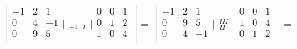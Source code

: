 $$
  \left[
  \begin{array}{rrr}
  -1 & 2 & 1 \\
    0 & 4 & -1 \\
    0 & 9 &  5 \\
  \end{array} \Bigg|
  \begin{array}{ccc}
    _{} \\
    _{} \\
    _{+4 \cdot I} \\
  \end{array}
  \Bigg| \begin{array}{rrr}
    0 & 0 & 1 \\
    0 & 1 & 2 \\
    1 & 0 & 4 \\
  \end{array} \right] = \left[
  \begin{array}{rrr}
  -1 & 2 & 1 \\
    0 & 9 &  5 \\
    0 & 4 & -1 \\
  \end{array} \Bigg|
  \begin{array}{ccc}
    _{} \\
    _{III} \\
    _{II} \\
  \end{array}
  \Bigg| \begin{array}{rrr}
    0 & 0 & 1 \\
    1 & 0 & 4 \\
    0 & 1 & 2 \\
  \end{array} \right] =
$$

